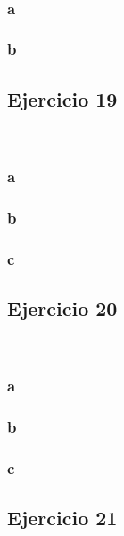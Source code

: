 \documentclass{article}
\begin{document}
\

\subsubsection*{a}

\subsubsection*{b}

\subsection*{Ejercicio 19}

\

\subsubsection*{a}

\subsubsection*{b}

\subsubsection*{c}

\subsection*{Ejercicio 20}

\

\subsubsection*{a}

\subsubsection*{b}

\subsubsection*{c}

\subsection*{Ejercicio 21}

\
\end{document}
